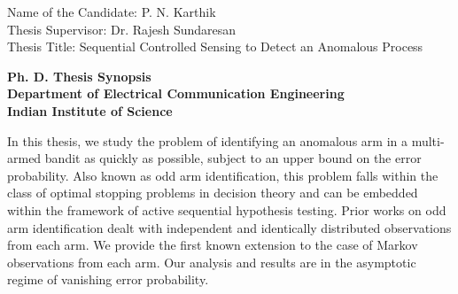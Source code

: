 \documentclass[11pt]{letter} %
\begin{document}

\begin{letter}{Name of the Candidate: P. N. Karthik\\
Thesis Supervisor: Dr. Rajesh Sundaresan\\
Thesis Title: Sequential Controlled Sensing to Detect an Anomalous Process\\
} 


\begin{center}
\Large\bf Ph. D. Thesis Synopsis\\
Department of Electrical Communication Engineering \\Indian Institute of Science %
\end{center} 
\vfill



\opening{} 
 
In this thesis, we study the problem of identifying an anomalous arm in a multi-armed bandit as quickly as possible, subject to an upper bound on the error probability. Also known as odd arm identification, this problem falls within the class of optimal stopping problems in decision theory and can be embedded within the framework of active sequential hypothesis testing. Prior works on odd arm identification dealt with independent and identically distributed observations from each arm. We provide the first known extension to the case of Markov observations from each arm. Our analysis and results are in the asymptotic regime of vanishing error probability.


\end{letter}
\end{document}
